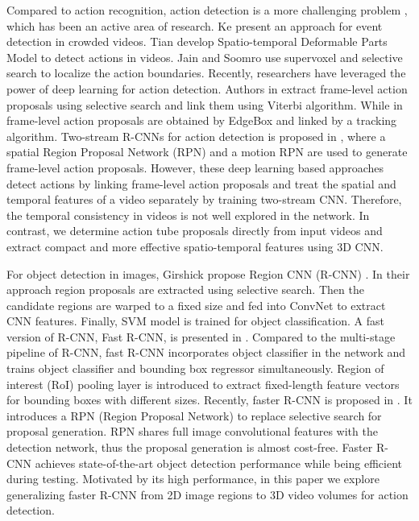 \documentclass[10pt,twocolumn,letterpaper]{article}
\begin{document}
Compared to action recognition, action detection is a more challenging problem \cite{gaidon2013temporal,jain201515}, which has been an active area of research.
Ke \etal \cite{ke2007event} present an approach for event detection in crowded videos. Tian \etal \cite{tian2013spatiotemporal} develop Spatio-temporal Deformable Parts Model \cite{dpm} to detect actions in videos. Jain \etal \cite{jain2014action} and Soomro \etal \cite{soomro2015action} use supervoxel and selective search to localize the action boundaries. Recently, researchers have leveraged the power of deep learning for action detection. Authors in \cite{gkioxari2015finding} extract frame-level action proposals using selective search and link them using Viterbi algorithm. While in \cite{weinzaepfel2015learning}  frame-level action proposals are obtained by EdgeBox and linked by a tracking algorithm. Two-stream R-CNNs for action detection is proposed in  \cite{peng2016multi}, where a spatial Region Proposal Network (RPN) and a motion RPN are used to generate frame-level action proposals. However, these deep learning based approaches detect actions by linking frame-level action proposals and treat the spatial  and temporal features of a video separately by training two-stream CNN. Therefore, the temporal consistency in videos is not well explored in the network. In contrast, we determine action tube proposals directly from input videos and extract compact and more effective spatio-temporal features using 3D CNN.

 For object detection in images, Girshick \etal propose Region CNN (R-CNN) \cite{rcnn_Girshick_2014_CVPR}.  In their approach region proposals are extracted using selective search. Then the candidate regions are warped to a fixed size and fed into ConvNet to extract CNN features. Finally, SVM model is trained for object classification. A fast version of R-CNN, Fast R-CNN, is presented in \cite{fast_rcnn_Girshick_2015_ICCV}. Compared to the multi-stage pipeline of R-CNN, fast R-CNN incorporates object classifier in the network and trains object classifier and bounding box regressor simultaneously. Region of interest (RoI) pooling layer is introduced to extract fixed-length feature vectors for bounding boxes with different sizes. Recently, faster R-CNN is proposed in \cite{faster_rcnn}. It introduces a RPN (Region Proposal Network) to replace selective search for proposal generation. RPN shares full image convolutional features with the detection network, thus the proposal generation is almost cost-free. Faster R-CNN achieves state-of-the-art object detection performance while being efficient during testing. Motivated by its high performance, in this paper we explore generalizing faster R-CNN from 2D image regions to 3D video volumes for action detection.
\end{document}
